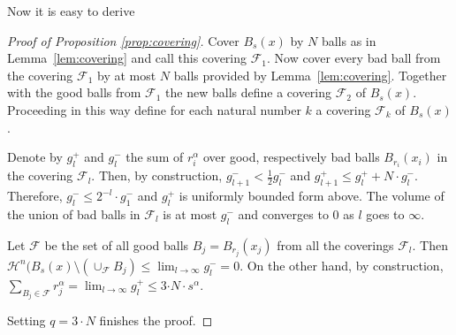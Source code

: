 \documentclass[12pt,leqno,intlimits]{amsart}
\numberwithin{equation}{section}
\theoremstyle{definition}
\theoremstyle{remark}
\newcommand{\lref}[1]{Lemma~\ref{#1}}
\begin{document}
Now it is easy to derive
\begin{proof}[Proof of Proposition \ref{prop:covering}]
Cover $B_{s} (x)$ by $N$ balls as in \lref{lem:covering} and call this covering $\mathcal F_1$. Now cover every bad
ball from the covering $\mathcal F_1$ by at most $N$ balls provided by \lref{lem:covering}. Together with the good balls from $\mathcal F_1$ the new balls define a covering $\mathcal F_2$ of $B_s (x)$. Proceeding in this way define for each natural number $k$ a covering $\mathcal F_k$ of $B_s(x)$.

Denote by $g_l^{+}$ and $g_l ^-$ the sum of $r_i ^{\alpha}$ over good, respectively bad balls $B_{r_i} (x_i)$ in the covering $\mathcal F_l$.
Then, by construction, $g_{l+1} ^- < \frac 1 2 g_l ^-$ and $g_{l+1} ^+ \leq g_l ^+ + N\cdot g_l ^-$. Therefore, $g_l^- \leq 2^{-l} \cdot g_1 ^-$
and $g_l^+$ is uniformly bounded form above.
The volume of the union of bad balls in $\mathcal F_l$ is at most $g_l^-$ and converges to $0$ as $l$ goes to $\infty$.

Let $\mathcal F$ be the set of all good balls $B_j =B_{r_j} (x_j)$ from all the coverings $\mathcal F_l$.
Then $\mathcal H^n (B_s (x) \setminus (\cup _{\mathcal F} B_j ) \leq \lim _{l\to \infty} g_l ^- =0$. On the other hand,
by construction,
$\sum _{B_j\in \mathcal F} r_j^{\alpha} 
= \lim _{l\to \infty} g_l^+ 
\leq 3{\cdot N}{\cdot} s^{\alpha}$.

 Setting $q=3\cdot N$ finishes the proof.
\end{proof}
\end{document}
